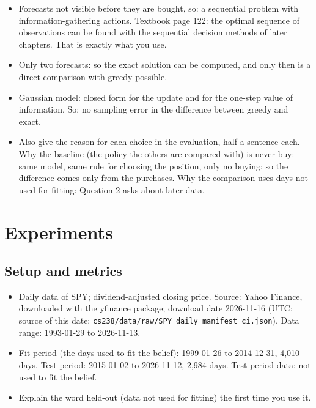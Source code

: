 \documentclass{article}
\newenvironment{pts}{\begin{itemize}[nosep,leftmargin=1.15em,topsep=1pt]}{\end{itemize}}
\begin{document}
\begin{note}
\begin{pts}
\item Forecasts not visible before they are bought, so: a sequential problem with information-gathering actions. Textbook page 122: the optimal sequence of observations can be found with the sequential decision methods of later chapters. That is exactly what you use.
\item Only two forecasts: so the exact solution can be computed, and only then is a direct comparison with greedy possible.
\item Gaussian model: closed form for the update and for the one-step value of information. So: no sampling error in the difference between greedy and exact.
\item Also give the reason for each choice in the evaluation, half a sentence each. Why the baseline (the policy the others are compared with) is never buy: same model, same rule for choosing the position, only no buying; so the difference comes only from the purchases. Why the comparison uses days not used for fitting: Question 2 asks about later data.
\end{pts}
\end{note}

\section{Experiments}

\subsection{Setup and metrics}

\begin{note}
\begin{pts}
\item Daily data of SPY; dividend-adjusted closing price. Source: Yahoo Finance, downloaded with the yfinance package; download date 2026-11-16 (UTC; source of this date: \texttt{cs238/data/raw/SPY\_daily\_manifest\_ci.json}). Data range: 1993-01-29 to 2026-11-13.
\item Fit period (the days used to fit the belief): 1999-01-26 to 2014-12-31, 4{,}010 days. Test period: 2015-01-02 to 2026-11-12, 2{,}984 days. Test period data: not used to fit the belief.
\item Explain the word held-out (data not used for fitting) the first time you use it.
\end{pts}
\end{note}
\end{document}
